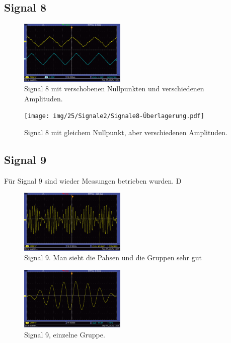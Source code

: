 \newpage

\subsection*{Signal 8}
\begin{figure} [h!]
    \centering
        \includegraphics[width=0.45\textwidth]{img/25/Signale2/Signale8-deutlich-getrennt.pdf}
    \caption{Signal 8 mit verschobenen Nullpunkten und verschiedenen Amplituden.}
\end{figure}

\begin{figure} [h!]
    \centering
        \texttt{[image: img/25/Signale2/Signale8-Überlagerung.pdf]}
    \caption{Signal 8 mit gleichem Nullpunkt, aber verschiedenen Amplituden.}
\end{figure}

\newpage 

\subsection*{Signal 9}

Für Signal 9 sind wieder Messungen betrieben wurden. D
\begin{figure} [h!]
    \centering
        \includegraphics[width=0.45\textwidth]{img/25/Signale2/Signal9-Gesamt.pdf}
    \caption{Signal 9. Man sieht die Pahsen und die Gruppen sehr gut}
\end{figure}

\begin{figure} [h!]
    \centering
        \includegraphics[width=0.45\textwidth]{img/25/Signale2/Signal9-einzeln.pdf}
    \caption{Signal 9, einzelne Gruppe.}
\end{figure}

